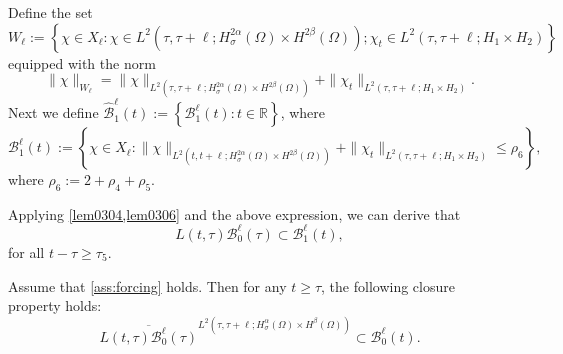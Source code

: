 \documentclass[oneside,preprint,12pt,numbers,sort&compress]{elsarticle}
\begin{document}
Define the set
\begin{equation}\label{defWl}
W_{\ell}:=
\left\{
 \chi\in X_{\ell}: 
 \chi\in {L^{2}(\tau,\tau+\ell;H_\sigma^{2\alpha}(\Omega) \times H^{2\beta}(\Omega))};
 \chi_{t}\in {L^{2}(\tau,\tau+\ell;H_{1} \times H_{2})}
\right\}
\end{equation}
equipped with the norm 
\begin{equation*}
\|\chi\|_{W_{\ell}}
=\|\chi\|_{L^{2}(\tau,\tau+\ell;H_\sigma^{2\alpha}(\Omega) \times H^{2\beta}(\Omega))}
+\|\chi_{t}\|_{L^{2}(\tau,\tau+\ell;H_{1} \times H_{2})}.
\end{equation*}
Next we define $\hat{\mathcal{B}}_{1}^{\ell}(t):=\left\{ \mathcal{B}_{1}^{\ell}(t):t\in\mathbb{R} \right\}$, where 
\[
\mathcal{B}_{1}^{\ell}(t):=\left\{\chi \in X_{\ell}:\|\chi\|_{L^{2}(t,t+\ell;H_\sigma^{2\alpha}(\Omega) \times H^{2\beta}(\Omega))}
+\|\chi_{t}\|_{L^{2}(\tau,\tau+\ell;H_{1} \times H_{2})}\leq \rho_{6} \right\},
\]
where $\rho_{6}:=2+\rho_{4}+\rho_{5}$.

Applying \cref{lem0304,lem0306} and the above expression, we can derive that
\[
L(t, \tau) \mathcal{B}_0^\ell(\tau) \subset \mathcal{B}_{1}^\ell(t),
\]
for all $t-\tau \geq \tau_{5}$.

\begin{lemma}\label{lem0307}
Assume that \cref{ass:forcing} holds. Then for any $t \geq \tau$, the following closure property holds:
\[
\overline{L(t, \tau) \mathcal{B}_0^\ell(\tau)}^{L^{2}(\tau,\tau+\ell;H_\sigma^{\alpha}(\Omega) \times H^{\beta}(\Omega))} \subset \mathcal{B}_0^\ell(t).
\]
\end{lemma}
\end{document}
